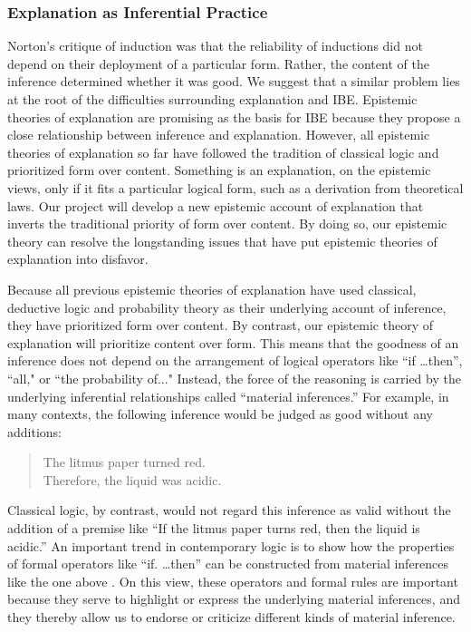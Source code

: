 \documentclass{article}[11pt]
\begin{document}
\subsubsection*{Explanation as Inferential Practice}



Norton's critique of induction was that the reliability of inductions did not depend on their deployment of a particular form.  Rather, the content of the inference determined whether it was good.  We suggest that a similar problem lies at the root of the difficulties surrounding explanation and IBE.  Epistemic theories of explanation are promising as the basis for IBE because they propose a close relationship between inference and explanation.  However, all epistemic theories of explanation so far have followed the tradition of classical logic and prioritized form over content.  Something is an explanation, on the epistemic views, only if it fits a particular logical form, such as a derivation from theoretical laws. Our project will develop a new epistemic account of explanation that inverts the traditional priority of form over content.  By doing so, our epistemic theory can resolve the longstanding issues that have put epistemic theories of explanation into disfavor.

Because all previous epistemic theories of explanation have used classical, deductive logic and probability theory as their underlying account of inference, they have prioritized form over content.  By contrast, our epistemic theory of explanation will prioritize content over form. This means that the goodness of an inference does not depend on the arrangement of logical operators like ``if \dots then'', ``all," or ``the probability of..."  Instead, the force of the reasoning is carried by the underlying inferential relationships called ``material inferences.''  For example, in many contexts, the following inference would be judged as good without any additions:

\begin{quote}
The litmus paper turned red. \\[-6pt]
Therefore, the liquid was acidic.	
\end{quote}

\noindent Classical logic, by contrast, would not regard this inference as valid without the addition of a premise like ``If the litmus paper turns red, then the liquid is acidic.''  An important trend in contemporary logic is to show how the properties of formal operators like ``if. \dots then'' can be constructed from material inferences like the one above \citep{Brandom2008,Brandom1994,Peregrin2014}. On this view, these operators and formal rules are important because they serve to highlight or express the underlying material inferences, and they thereby allow us to endorse or criticize different kinds of material inference.
\end{document}
